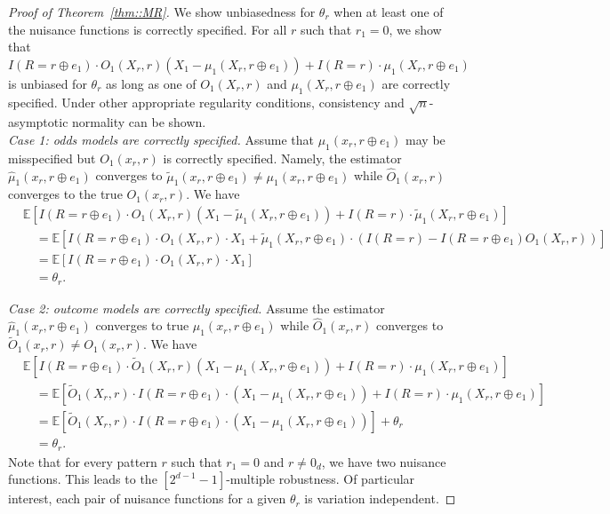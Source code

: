 \documentclass[aos, preprint]{imsart}
\theoremstyle{plain}
\theoremstyle{definition}
\let\hat\widehat
\let\tilde\widetilde
\newcommand{\E}{\mbox{$\mathbb{E}$}}
\begin{document}
\begin{appendix}
	\begin{proof}[Proof of Theorem~\ref{thm::MR}]
		We show unbiasedness for $\theta_r$ when at least one of the nuisance functions is correctly specified.  For all $r$ such that $r_1=0$, we show that $I(R=r\oplus e_1)\cdot O_1(X_r,r) (X_1 - \mu_1(X_r, r\oplus e_1)) + I(R=r) \cdot \mu_1(X_r, r\oplus e_1)$ is unbiased for $\theta_r$ as long as one of $O_1(X_r,r)$ and $\mu_1(X_r, r\oplus e_1)$ are correctly specified.  Under other appropriate regularity conditions, consistency and $\sqrt{n}$-asymptotic normality can be shown.\\
		
		\textit{Case 1: odds models are correctly specified.} Assume that $\mu_1(x_r,r\oplus e_1)$ may be misspecified but $O_1(x_r,r)$ is correctly specified.  
		Namely, the estimator $\hat \mu_1(x_r,r\oplus e_1)$ converges to $\tilde\mu_1(x_r,r\oplus e_1)\neq \mu_1(x_r,r\oplus e_1)$ while $\hat O_1(x_r,r)$ converges to the true $O_1(x_r,r)$.  We have
		\begin{align*}
			&\E[I(R=r\oplus e_1)\cdot O_1(X_r,r) (X_1 - \tilde\mu_1(X_r,r\oplus e_1)) + I(R=r) \cdot \tilde\mu_1(X_r,r\oplus e_1)] \\
			&\quad = \E[I(R=r\oplus e_1)\cdot O_1(X_r,r) \cdot X_1 + \tilde\mu_1(X_r,r\oplus e_1) \cdot (I(R=r)- I(R=r\oplus e_1) O_1(X_r,r))] \\
			&\quad =  \E[I(R=r\oplus e_1)\cdot O_1(X_r,r) \cdot X_1] \\
			&\quad = \theta_r.
		\end{align*}
	
		\textit{Case 2: outcome models are correctly specified.} 
		Assume the estimator $\hat \mu_1(x_r,r\oplus e_1)$ converges to true $\mu_1(x_r,r\oplus e_1)$ while $\hat O_1(x_r,r)$ converges to  $\tilde O_1(x_r,r)\neq O_1(x_r,r)$.
		We have
		\begin{align*}
			&\E[I(R=r\oplus e_1)\cdot \tilde O_1(X_r,r) (X_1 - \mu_1(X_r, r\oplus e_1)) + I(R=r) \cdot \mu_1(X_r, r\oplus e_1)] \\
			&\quad = \E[\tilde O_1(X_r,r) \cdot I(R=r\oplus e_1)\cdot (X_1 - \mu_1(X_r, r\oplus e_1)) + I(R=r) \cdot \mu_1(X_r, r\oplus e_1)] \\
			&\quad = \E[\tilde O_1(X_r,r) \cdot I(R=r\oplus e_1)\cdot (X_1 - \mu_1(X_r, r\oplus e_1))] + \theta_r \\
			&\quad = \theta_r.
		\end{align*}
		Note that for every pattern $r$ such that $r_1=0$ and $r\neq 0_d$, we have two nuisance functions.  This leads to the $[2^{d-1}-1]$-multiple robustness.  Of particular interest, each pair of nuisance functions for a given $\theta_r$ is variation independent.
	\end{proof}



\end{appendix}
\end{document}
